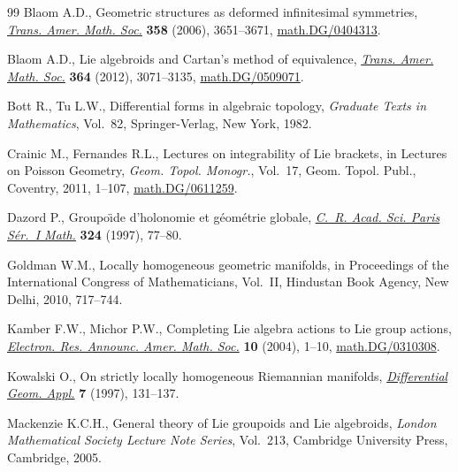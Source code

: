 \documentclass[11pt]{article}
\numberwithin{equation}{section}
\begin{document}
\begin{thebibliography}{99}
Blaom A.D., Geometric structures as deformed inf\/initesimal symmetries,
  \href{http://dx.doi.org/10.1090/S0002-9947-06-04057-8}{\textit{Trans. Amer. Math. Soc.}} \textbf{358} (2006), 3651--3671,
  \href{http://arxiv.org/abs/math.DG/0404313}{math.DG/0404313}.

Blaom A.D., Lie algebroids and {C}artan's method of equivalence, \href{http://dx.doi.org/10.1090/S0002-9947-2012-05441-9}{\textit{Trans.
  Amer. Math. Soc.}} \textbf{364} (2012), 3071--3135, \href{http://arxiv.org/abs/math.DG/0509071}{math.DG/0509071}.

Bott R., Tu L.W., Dif\/ferential forms in algebraic topology, \textit{Graduate
  Texts in Mathematics}, Vol.~82, Springer-Verlag, New York, 1982.

Crainic M., Fernandes R.L., Lectures on integrability of {L}ie brackets, in
  Lectures on {P}oisson Geometry, \textit{Geom. Topol. Monogr.}, Vol.~17, Geom.
  Topol. Publ., Coventry, 2011, 1--107, \href{http://arxiv.org/abs/math.DG/0611259}{math.DG/0611259}.

Dazord P., Groupo\"\i de d'holonomie et g\'eom\'etrie globale, \href{http://dx.doi.org/10.1016/S0764-4442(97)80107-3}{\textit{C.~R.
  Acad. Sci. Paris S\'er.~I Math.}} \textbf{324} (1997), 77--80.

Goldman W.M., Locally homogeneous geometric manifolds, in Proceedings of the
  {I}nternational {C}ongress of {M}athematicians, {V}ol.~{II}, Hindustan Book
  Agency, New Delhi, 2010, 717--744.

Kamber F.W., Michor P.W., Completing {L}ie algebra actions to {L}ie group
  actions, \href{http://dx.doi.org/10.1090/S1079-6762-04-00124-6}{\textit{Electron. Res. Announc. Amer. Math. Soc.}} \textbf{10}
  (2004), 1--10, \href{http://arxiv.org/abs/math.DG/0310308}{math.DG/0310308}.

Kowalski O., On strictly locally homogeneous {R}iemannian manifolds,
  \href{http://dx.doi.org/10.1016/S0926-2245(96)00043-5}{\textit{Differential Geom. Appl.}} \textbf{7} (1997), 131--137.

Mackenzie K.C.H., General theory of {L}ie groupoids and {L}ie algebroids,
  \textit{London Mathematical Society Lecture Note Series}, Vol.~213, Cambridge
  University Press, Cambridge, 2005.

\end{thebibliography}
\end{document}
